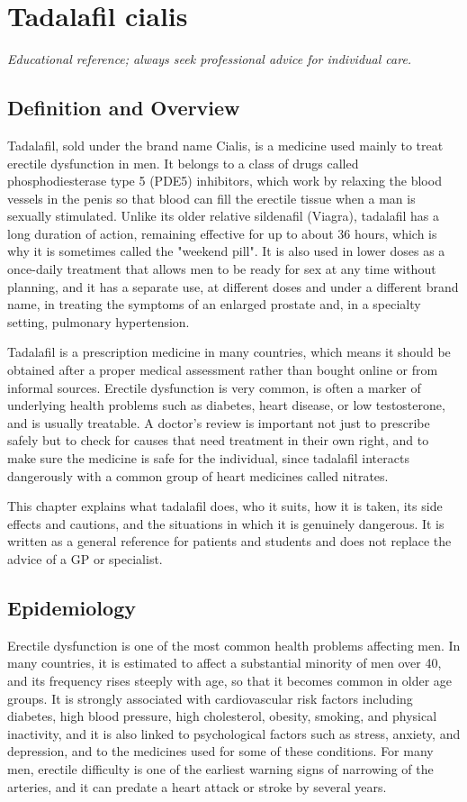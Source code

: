 \chapter{Tadalafil cialis}

\medskip
\noindent\textit{Educational reference; always seek professional advice for individual care.}

\section*{Definition and Overview}
Tadalafil, sold under the brand name Cialis, is a medicine used mainly to treat erectile dysfunction in men. It belongs to a class of drugs called phosphodiesterase type 5 (PDE5) inhibitors, which work by relaxing the blood vessels in the penis so that blood can fill the erectile tissue when a man is sexually stimulated. Unlike its older relative sildenafil (Viagra), tadalafil has a long duration of action, remaining effective for up to about 36 hours, which is why it is sometimes called the "weekend pill". It is also used in lower doses as a once-daily treatment that allows men to be ready for sex at any time without planning, and it has a separate use, at different doses and under a different brand name, in treating the symptoms of an enlarged prostate and, in a specialty setting, pulmonary hypertension.

Tadalafil is a prescription medicine in many countries, which means it should be obtained after a proper medical assessment rather than bought online or from informal sources. Erectile dysfunction is very common, is often a marker of underlying health problems such as diabetes, heart disease, or low testosterone, and is usually treatable. A doctor's review is important not just to prescribe safely but to check for causes that need treatment in their own right, and to make sure the medicine is safe for the individual, since tadalafil interacts dangerously with a common group of heart medicines called nitrates.

This chapter explains what tadalafil does, who it suits, how it is taken, its side effects and cautions, and the situations in which it is genuinely dangerous. It is written as a general reference for patients and students and does not replace the advice of a GP or specialist.

\section*{Epidemiology}
Erectile dysfunction is one of the most common health problems affecting men. In many countries, it is estimated to affect a substantial minority of men over 40, and its frequency rises steeply with age, so that it becomes common in older age groups. It is strongly associated with cardiovascular risk factors including diabetes, high blood pressure, high cholesterol, obesity, smoking, and physical inactivity, and it is also linked to psychological factors such as stress, anxiety, and depression, and to the medicines used for some of these conditions. For many men, erectile difficulty is one of the earliest warning signs of narrowing of the arteries, and it can predate a heart attack or stroke by several years.

